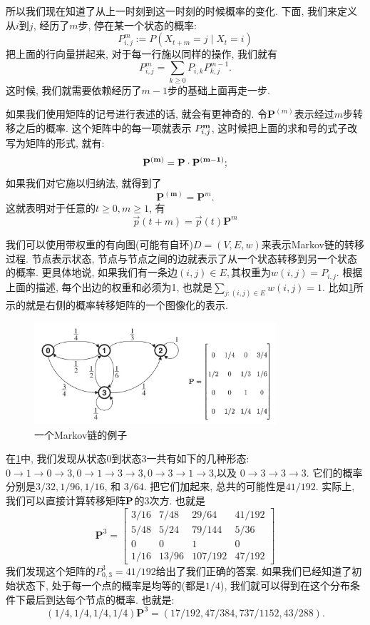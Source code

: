 所以我们现在知道了从上一时刻到这一时刻的时候概率的变化. 下面, 我们来定义从$i$到$j$, 经历了$m$步, 停在某一个状态的概率: 
$$
P_{i, j}^m:={P}\left(X_{t+m}=j \mid X_t=i\right)
$$
把上面的行向量拼起来, 对于每一行施以同样的操作, 我们就有$$P_{i, j}^m=\sum_{k \geq 0} P_{i, k} P_{k, j}^{m-1}. $$ 这时候, 我们就需要依赖经历了$m-1$步的基础上面再走一步. 

如果我们使用矩阵的记号进行表述的话, 就会有更神奇的. 令$\mathbf{P}^{({m})}$表示经过$m$步转移之后的概率. 这个矩阵中的每一项就表示
$P_{i, j}^{\bf{m}}$, 这时候把上面的求和号的式子改写为矩阵的形式, 就有: 
$$
\mathbf{P}^{(\bf {m})}=\mathbf{P} \cdot \mathbf{P}^{(\bf {m}-1)} ;
$$
如果我们对它施以归纳法, 就得到了$$
\mathbf{P}^{(\mathbf{m})}=\mathbf{P}^{{m}}.
$$
这就表明对于任意的$t\geq 0, m\geq 1$, 有
$$
\vec{p}(t+m)=\vec{p}(t) \mathbf{P}^{{m}}
$$

我们可以使用带权重的有向图(可能有自环)$D=(V,E,w)$来表示Markov链的转移过程. 节点表示状态, 节点与节点之间的边就表示了从一个状态转移到另一个状态的概率. 更具体地说, 如果我们有一条边$(i,j)\in E,$其权重为$w(i,j)=P_{i,j}$. 根据上面的描述, 每个出边的权重和必须为1, 也就是$\sum_{j:(i, j) \in E} w(i, j)=1$. 比如\cref{fig:markov-chain-graph}所示的就是右侧的概率转移矩阵的一个图像化的表示. 

\begin{figure}
    \includegraphics[width=0.8\textwidth]{fig/ch6/markov.jpg}
    \caption{一个Markov链的例子}
    \label{fig:markov-chain-graph}
\end{figure}

\begin{example}
    在\cref{fig:markov-chain-graph}中, 我们发现从状态0到状态3一共有如下的几种形态: $0\to 1\to 0\to 3,0\to 1\to 3\to 3,0\to 3\to 1\to 3$,以及 $0\to 3\to 3\to 3$. 它们的概率分别是$3 / 32,1 / 96,1 / 16$, 和 $3 / 64$. 把它们加起来, 总共的可能性是$41/192$. 实际上, 我们可以直接计算转移矩阵$\bf P$的$3$次方. 也就是
    $$\mathbf{P}^3=\left[\begin{array}{cccc}3 / 16 & 7 / 48 & 29 / 64 & 41 / 192 \\ 5 / 48 & 5 / 24 & 79 / 144 & 5 / 36 \\ 0 & 0 & 1 & 0 \\ 1 / 16 & 13 / 96 & 107 / 192 & 47 / 192\end{array}\right]$$
    我们发现这个矩阵的$P_{0,3}^3=41 / 192$给出了我们正确的答案. 如果我们已经知道了初始状态下, 处于每一个点的概率是均等的(都是$1/4$), 我们就可以得到在这个分布条件下最后到达每个节点的概率. 也就是: 
    $$(1 / 4,1 / 4,1 / 4,1 / 4) \mathbf{P}^3=(17 / 192,47 / 384,737 / 1152,43 / 288).$$
\end{example}